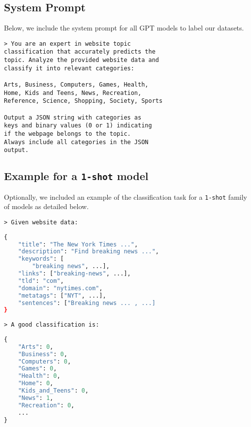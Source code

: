\subsection{System Prompt}\label{app:system-prompt}
Below, we include the system prompt for all GPT models to label our datasets.

\begin{verbatim}
> You are an expert in website topic 
classification that accurately predicts the 
topic. Analyze the provided website data and 
classify it into relevant categories:

Arts, Business, Computers, Games, Health, 
Home, Kids and Teens, News, Recreation, 
Reference, Science, Shopping, Society, Sports

Output a JSON string with categories as
keys and binary values (0 or 1) indicating 
if the webpage belongs to the topic. 
Always include all categories in the JSON 
output.
\end{verbatim}

\subsection{Example for a \texttt{1-shot} model}\label{app:example-1-shot}
Optionally, we included an example of the classification task for a \texttt{1-shot} family
of models as detailed below.

\begin{verbatim}
> Given website data:
\end{verbatim}

\begin{lstlisting}[showstringspaces=false,language=Python]
{         
    "title": "The New York Times ...",
    "description": "Find breaking news ...",
    "keywords": [
        "breaking news", ...],
    "links": ["breaking-news", ...],
    "tld": "com",
    "domain": "nytimes.com",
    "metatags": ["NYT", ...],
    "sentences": ["Breaking news ... , ...]
}
\end{lstlisting}

\begin{verbatim}
> A good classification is:
\end{verbatim}

\begin{lstlisting}[showstringspaces=false,language=Python]
{
    "Arts": 0,
    "Business": 0,
    "Computers": 0,
    "Games": 0,
    "Health": 0,
    "Home": 0,
    "Kids_and_Teens": 0,
    "News": 1,
    "Recreation": 0,
    ...
}
\end{lstlisting}

